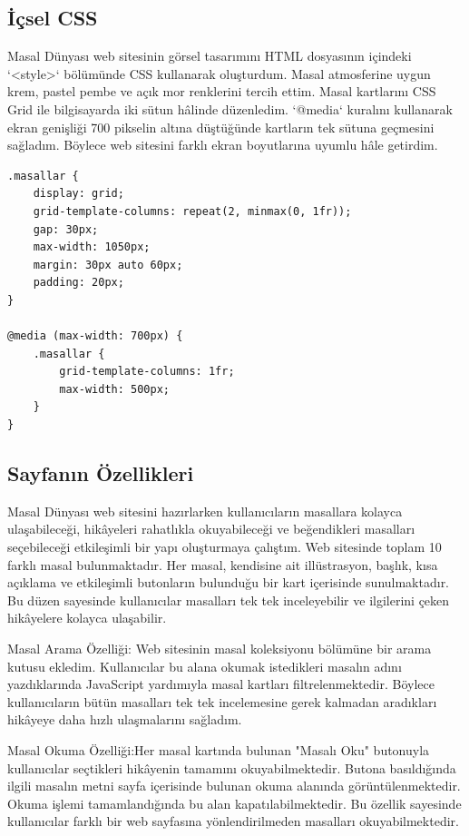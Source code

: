 \documentclass[12pt,a4paper]{article}
\begin{document}
\subsection{İçsel CSS}
Masal Dünyası web sitesinin görsel tasarımını HTML dosyasının içindeki `<style>` bölümünde CSS kullanarak oluşturdum. Masal atmosferine uygun krem, pastel pembe ve açık mor renklerini tercih ettim. Masal kartlarını CSS Grid ile bilgisayarda iki sütun hâlinde düzenledim. `@media` kuralını kullanarak ekran genişliği 700 pikselin altına düştüğünde kartların tek sütuna geçmesini sağladım. Böylece web sitesini farklı ekran boyutlarına uyumlu hâle getirdim.

\begin{lstlisting}[caption={İçsel CSS'ten önemli bir bölüm}]
.masallar {
    display: grid;
    grid-template-columns: repeat(2, minmax(0, 1fr));
    gap: 30px;
    max-width: 1050px;
    margin: 30px auto 60px;
    padding: 20px;
}

@media (max-width: 700px) {
    .masallar {
        grid-template-columns: 1fr;
        max-width: 500px;
    }
}
\end{lstlisting}

\subsection{Sayfanın Özellikleri}

Masal Dünyası web sitesini hazırlarken kullanıcıların masallara kolayca ulaşabileceği, hikâyeleri rahatlıkla okuyabileceği ve beğendikleri masalları seçebileceği etkileşimli bir yapı oluşturmaya çalıştım. Web sitesinde toplam 10 farklı masal bulunmaktadır. Her masal, kendisine ait illüstrasyon, başlık, kısa açıklama ve etkileşimli butonların bulunduğu bir kart içerisinde sunulmaktadır. Bu düzen sayesinde kullanıcılar masalları tek tek inceleyebilir ve ilgilerini çeken hikâyelere kolayca ulaşabilir.

Masal Arama Özelliği: Web sitesinin masal koleksiyonu bölümüne bir arama kutusu ekledim. Kullanıcılar bu alana okumak istedikleri masalın adını yazdıklarında JavaScript yardımıyla masal kartları filtrelenmektedir. Böylece kullanıcıların bütün masalları tek tek incelemesine gerek kalmadan aradıkları hikâyeye daha hızlı ulaşmalarını sağladım.

Masal Okuma Özelliği:Her masal kartında bulunan "Masalı Oku" butonuyla kullanıcılar seçtikleri hikâyenin tamamını okuyabilmektedir. Butona basıldığında ilgili masalın metni sayfa içerisinde bulunan okuma alanında görüntülenmektedir. Okuma işlemi tamamlandığında bu alan kapatılabilmektedir. Bu özellik sayesinde kullanıcılar farklı bir web sayfasına yönlendirilmeden masalları okuyabilmektedir.
\end{document}
